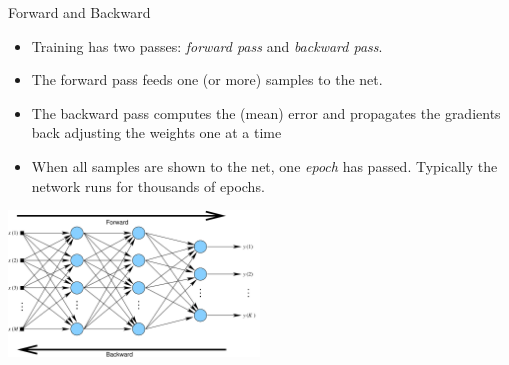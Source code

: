 \documentclass[10pt, aspectratio=169]{beamer} %
\begin{document}
\begin{frame}{Forward and Backward}
	\begin{itemize}
		\item Training has two passes: \emph{forward pass} and \emph{backward pass}.
		\item The forward pass feeds one (or more) samples to the net.
		\item The backward pass computes the (mean) error and propagates the gradients
		back adjusting the weights one at a time
		\item When all samples are shown to the net, one \emph{epoch} has passed. Typically the network
		runs for thousands of epochs.
		\end{itemize}
		
	\centerline{\includegraphics[width=0.5\textwidth]{VanillaNet_FB.pdf}}
	
\end{frame}
\end{document}

